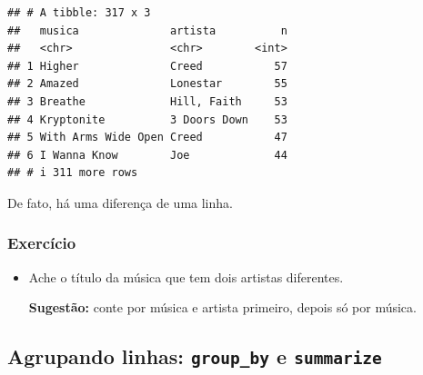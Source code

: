 \documentclass[
  11pt]{report}
\begin{document}
\begin{itemize}
\begin{verbatim}
## # A tibble: 317 x 3
##   musica              artista          n
##   <chr>               <chr>        <int>
## 1 Higher              Creed           57
## 2 Amazed              Lonestar        55
## 3 Breathe             Hill, Faith     53
## 4 Kryptonite          3 Doors Down    53
## 5 With Arms Wide Open Creed           47
## 6 I Wanna Know        Joe             44
## # i 311 more rows
\end{verbatim}

  De fato, há uma diferença de uma linha.
\end{itemize}

\hypertarget{exercuxedcio-1}{%
\subsubsection{Exercício}\label{exercuxedcio-1}}

\begin{itemize}
\item
  Ache o título da música que tem dois artistas diferentes.

  \textbf{Sugestão:} conte por música e artista primeiro, depois só por música.
\end{itemize}

\hypertarget{agrupando-linhas-group_by-e-summarize}{%
\subsection{\texorpdfstring{Agrupando linhas: \texttt{group\_by} e \texttt{summarize}}{Agrupando linhas: group\_by e summarize}}\label{agrupando-linhas-group_by-e-summarize}}
\end{document}
